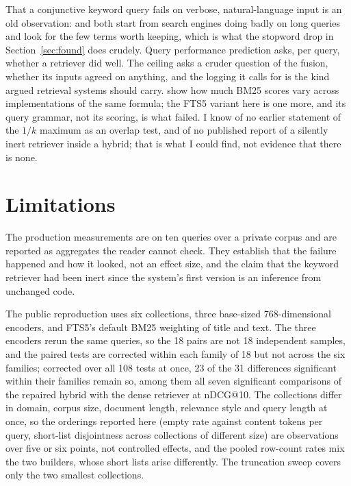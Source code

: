 \documentclass[11pt]{article}
\begin{document}
That a conjunctive keyword query fails on verbose, natural-language input is an old observation: \citet{kumaran2007shorter} and \citet{bendersky2008verbose} both start from search engines doing badly on long queries and look for the few terms worth keeping, which is what the stopword drop in Section~\ref{sec:found} does crudely. Query performance prediction \citep{cronentownsend2002qpp} asks, per query, whether a retriever did well. The ceiling asks a cruder question of the fusion, whether its inputs agreed on anything, and the logging it calls for is the kind \citet{cooper1998monitoring} argued retrieval systems should carry. \citet{kamphuis2020bm25} show how much BM25 scores vary across implementations of the same formula; the FTS5 variant here is one more, and its query grammar, not its scoring, is what failed. I know of no earlier statement of the $1/k$ maximum as an overlap test, and of no published report of a silently inert retriever inside a hybrid; that is what I could find, not evidence that there is none.

\section{Limitations}
\label{sec:limits}

The production measurements are on ten queries over a private corpus and are reported as aggregates the reader cannot check. They establish that the failure happened and how it looked, not an effect size, and the claim that the keyword retriever had been inert since the system's first version is an inference from unchanged code.

The public reproduction uses six collections, three base-sized 768-dimensional encoders, and FTS5's default BM25 weighting of title and text. The three encoders rerun the same queries, so the 18 pairs are not 18 independent samples, and the paired tests are corrected within each family of 18 but not across the six families; corrected over all 108 tests at once, 23 of the 31 differences significant within their families remain so, among them all seven significant comparisons of the repaired hybrid with the dense retriever at nDCG@10. The collections differ in domain, corpus size, document length, relevance style and query length at once, so the orderings reported here (empty rate against content tokens per query, short-list disjointness across collections of different size) are observations over five or six points, not controlled effects, and the pooled row-count rates mix the two builders, whose short lists arise differently. The truncation sweep covers only the two smallest collections.
\end{document}
